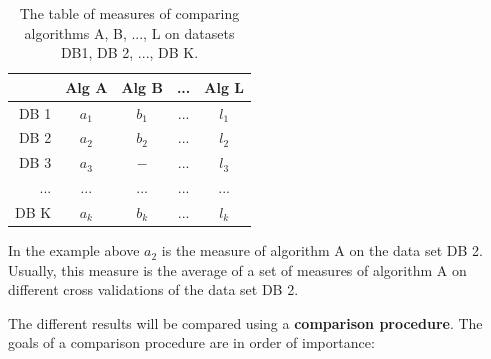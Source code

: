 \documentclass[twoside,11pt,preprint]{article}
\begin{document}
\begin{table}[ht]
\centering
\begin{tabular}{r|cccc}
 & Alg A & Alg B & ... & Alg L \\ \hline
 DB 1 & $a_1$ & $b_1$ & ... & $l_1$ \\
 DB 2 & $a_2$ & $b_2$ & ... & $l_2$ \\
 DB 3 & $a_3$ & $-$   & ... & $l_3$ \\
 ... & ... & ... & ... & ... \\
 DB K & $a_k$ & $b_k$ & ... & $l_k$ \\
\end{tabular}
\centering
\caption{The table of measures of comparing algorithms A, B, ..., L on datasets DB1, DB 2, ..., DB K.}\label{tab:tabfirst}
\end{table}

In the example above \(a_2\) is the measure of algorithm A on the data set DB 2. Usually, this measure is the average of a set of measures of algorithm A on different cross validations of the data set DB 2.

The different results will be compared using a \textbf{comparison procedure}.
The goals of a comparison procedure are in order of importance:
\end{document}
